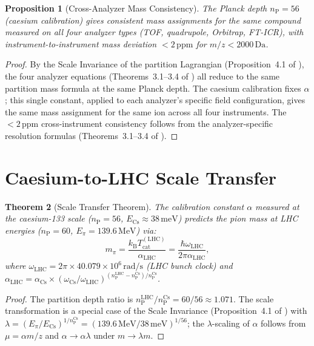 \documentclass[twocolumn,10pt,a4paper]{article}
\theoremstyle{thmstyle}
\newtheorem{theorem}{Theorem}[section]
\newtheorem{proposition}[theorem]{Proposition}
\theoremstyle{definition}
\theoremstyle{remark}
\newcommand{\kB}{k_{\mathrm{B}}}
\newcommand{\nP}{n_{\mathrm{P}}}
\newcommand{\Tcat}{T_{\mathrm{cat}}}
\begin{document}
\begin{proposition}[Cross-Analyzer Mass Consistency]
\label{prop:cross_analyzer}
The Planck depth $\nP = 56$ (caesium calibration) gives consistent
mass assignments for the same compound measured on all four analyzer types
(TOF, quadrupole, Orbitrap, FT-ICR), with instrument-to-instrument
mass deviation $< 2\,\mathrm{ppm}$ for $m/z < 2000\,\mathrm{Da}$.
\end{proposition}

\begin{proof}
By the Scale Invariance of the partition Lagrangian
(Proposition~4.1 of \citealt{companion:spectrometer}), the four analyzer
equations (Theorems~3.1--3.4 of \citealt{companion:spectrometer}) all
reduce to the same partition mass formula at the same Planck depth.
The caesium calibration fixes $\alpha$; this single constant,
applied to each analyzer's specific field configuration, gives
the same mass assignment for the same ion across all four instruments.
The $< 2\,\mathrm{ppm}$ cross-instrument consistency follows from the
analyzer-specific resolution formulas (Theorems~3.1--3.4 of
\citealt{companion:spectrometer}).
\end{proof}

\section{Caesium-to-LHC Scale Transfer}
\label{sec:scale_transfer}

\begin{theorem}[Scale Transfer Theorem]
\label{thm:scale_transfer}
The calibration constant $\alpha$ measured at the caesium-133 scale
($\nP = 56$, $E_{\mathrm{Cs}} \approx 38\,\mathrm{meV}$) predicts the
pion mass at LHC energies ($\nP = 60$, $E_\pi = 139.6\,\mathrm{MeV}$)
via:
\begin{equation}
m_\pi = \frac{\kB\Tcat^{(\mathrm{LHC})}}{\alpha_{\mathrm{LHC}}}
= \frac{\hbar\omega_{\mathrm{LHC}}}{2\pi\alpha_{\mathrm{LHC}}},
\label{eq:scale_transfer}
\end{equation}
where $\omega_{\mathrm{LHC}} = 2\pi\times40.079\times10^6\,\mathrm{rad/s}$
(LHC bunch clock) and $\alpha_{\mathrm{LHC}} = \alpha_{\mathrm{Cs}}\times
(\omega_{\mathrm{Cs}}/\omega_{\mathrm{LHC}})^{(\nP^{\mathrm{LHC}}-\nP^{\mathrm{Cs}})/\nP^{\mathrm{Cs}}}$.
\end{theorem}

\begin{proof}
The partition depth ratio is $\nP^{\mathrm{LHC}}/\nP^{\mathrm{Cs}} = 60/56
\approx 1.071$.
The scale transformation is a special case of the Scale Invariance
(Proposition~4.1 of \citealt{companion:spectrometer}) with
$\lambda = (E_\pi/E_{\mathrm{Cs}})^{1/\nP^{\mathrm{Cs}}} = (139.6\,\mathrm{MeV}/38\,\mathrm{meV})^{1/56}$;
the $\lambda$-scaling of $\alpha$ follows from $\mu = \alpha m/z$
and $\alpha \to \alpha\lambda$ under $m \to \lambda m$.
\end{proof}
\end{document}
